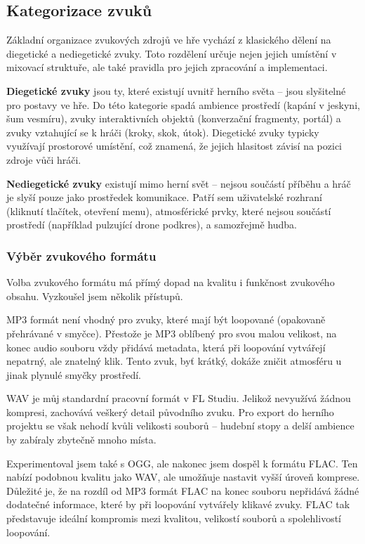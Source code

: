 \subsection{Kategorizace zvuků}
\label{sec:kategorizace-zvuku}

Základní organizace zvukových zdrojů ve hře vychází z klasického dělení na diegetické a nediegetické zvuky. Toto rozdělení určuje nejen jejich umístění v mixovací struktuře, ale také pravidla pro jejich zpracování a implementaci.

\textbf{Diegetické zvuky} jsou ty, které existují uvnitř herního světa -- jsou slyšitelné pro postavy ve hře. Do této kategorie spadá ambience prostředí (kapání v jeskyni, šum vesmíru), zvuky interaktivních objektů (konverzační fragmenty, portál) a zvuky vztahující se k hráči (kroky, skok, útok). Diegetické zvuky typicky využívají prostorové umístění, což znamená, že jejich hlasitost závisí na pozici zdroje vůči hráči.

\textbf{Nediegetické zvuky} existují mimo herní svět -- nejsou součástí příběhu a hráč je slyší pouze jako prostředek komunikace. Patří sem uživatelské rozhraní (kliknutí tlačítek, otevření menu), atmosférické prvky, které nejsou součástí prostředí (například pulzující drone podkres), a samozřejmě hudba.

\subsubsection{Výběr zvukového formátu}
Volba zvukového formátu má přímý dopad na kvalitu i funkčnost zvukového obsahu. Vyzkoušel jsem několik přístupů.

MP3 formát není vhodný pro zvuky, které mají být loopované (opakovaně přehrávané v smyčce). Přestože je MP3 oblíbený pro svou malou velikost, na konec audio souboru vždy přidává metadata, která při loopování vytvářejí nepatrný, ale znatelný klik. Tento zvuk, byť krátký, dokáže zničit atmosféru u jinak plynulé smyčky prostředí.

WAV je můj standardní pracovní formát v FL Studiu. Jelikož nevyužívá žádnou kompresi, zachovává veškerý detail původního zvuku. Pro export do herního projektu se však nehodí kvůli velikosti souborů -- hudební stopy a delší ambience by zabíraly zbytečně mnoho místa.

Experimentoval jsem také s OGG, ale nakonec jsem dospěl k formátu FLAC. Ten nabízí podobnou kvalitu jako WAV, ale umožňuje nastavit vyšší úroveň komprese. Důležité je, že na rozdíl od MP3 formát FLAC na konec souboru nepřidává žádné dodatečné informace, které by při loopování vytvářely klikavé zvuky. FLAC tak představuje ideální kompromis mezi kvalitou, velikostí souborů a spolehlivostí loopování.

